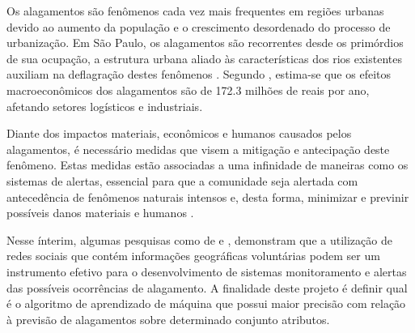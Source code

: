 Os alagamentos são fenômenos cada vez mais frequentes em regiões urbanas devido ao aumento da população e o crescimento desordenado do processo de urbanização. Em São Paulo, os alagamentos são recorrentes desde os primórdios de sua ocupação, a estrutura urbana aliado às características dos rios existentes auxiliam na deflagração destes fenômenos \cite{hirata2013mapeamento}. Segundo \cite{santos2013impactos}, estima-se que os efeitos macroeconômicos dos alagamentos são de 172.3 milhões de reais por ano, afetando setores logísticos e industriais.
\par Diante dos impactos materiais, econômicos e humanos causados pelos alagamentos, é necessário medidas que visem a mitigação e antecipação deste fenômeno. Estas medidas estão associadas a uma infinidade de maneiras como os sistemas de alertas, essencial para que a comunidade seja alertada com antecedência de fenômenos naturais intensos e, desta forma, minimizar e previnir possíveis danos materiais e humanos \cite{kobiyama2006prevenccao}. 
\par Nesse ínterim, algumas pesquisas como de \cite{horita2015development} e  \cite{hirata2013mapeamento}, demonstram que a utilização de redes sociais que contém informações geográficas voluntárias podem ser um instrumento efetivo para o desenvolvimento de sistemas monitoramento e alertas das possíveis ocorrências de alagamento. A finalidade deste projeto é definir qual é o algoritmo de aprendizado de máquina que possui maior precisão com relação à previsão de alagamentos sobre determinado conjunto atributos. 
